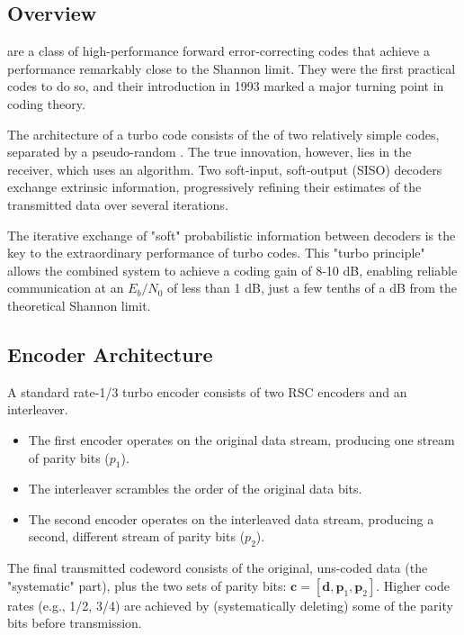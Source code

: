 \subsection{Overview}

 are a class of high-performance forward error-correcting codes that achieve a performance remarkably close to the Shannon limit. They were the first practical codes to do so, and their introduction in 1993 marked a major turning point in coding theory.

The architecture of a turbo code consists of the  of two relatively simple  codes, separated by a pseudo-random . The true innovation, however, lies in the receiver, which uses an  algorithm. Two soft-input, soft-output (SISO) decoders exchange extrinsic information, progressively refining their estimates of the transmitted data over several iterations.

\begin{keyconcept}
    The iterative exchange of "soft" probabilistic information between decoders is the key to the extraordinary performance of turbo codes. This "turbo principle" allows the combined system to achieve a coding gain of 8-10 dB, enabling reliable communication at an $E_b/N_0$ of less than 1 dB, just a few tenths of a dB from the theoretical Shannon limit.
\end{keyconcept}


\subsection{Encoder Architecture}

A standard rate-1/3 turbo encoder consists of two RSC encoders and an interleaver.
\begin{itemize}
    \item The first encoder operates on the original data stream, producing one stream of parity bits ($p_1$).
    \item The interleaver scrambles the order of the original data bits.
    \item The second encoder operates on the interleaved data stream, producing a second, different stream of parity bits ($p_2$).
\end{itemize}
The final transmitted codeword consists of the original, uns-coded data (the "systematic" part), plus the two sets of parity bits: $\mathbf{c} = [\mathbf{d}, \mathbf{p}_1, \mathbf{p}_2]$. Higher code rates (e.g., 1/2, 3/4) are achieved by  (systematically deleting) some of the parity bits before transmission.


